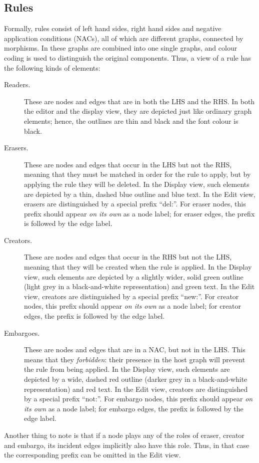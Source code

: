 \subsection{Rules}

Formally, rules consist of left hand sides, right hand sides and negative
application conditions (NACs), all of which are different graphs, connected by
morphisms. In \Groove{} these graphs are combined into one single graphs, and
colour coding is used to distinguish the original components. Thus, a \Groove{}
view of a rule has the following kinds of elements:

\begin{description}
\item[Readers.] These are nodes and edges that are in both the LHS and the RHS.
  In both the editor and the display view, they are depicted just like ordinary
  graph elements; hence, the outlines are thin and black and the font colour is
  black.

\item[Erasers.] These are nodes and edges that occur in the LHS but not the
  RHS, meaning that they must be matched in order for the rule to apply, but by
  applying the rule they will be deleted. In the Display view, such elements
  are depicted by a thin, dashed blue outline and blue text. In the Edit view,
  erasers are distinguished by a special prefix ``\textsf{del:}''. For eraser
  nodes, this prefix should appear \emph{on its own} as a node label; for
  eraser edges, the prefix is followed by the edge label.

\item[Creators.] These are nodes and edges that occur in the RHS but not the
  LHS, meaning that they will be created when the rule is applied. In the
  Display view, such elements are depicted by a slightly wider, solid green
  outline (light grey in a black-and-white representation) and green text. In
  the Edit view, creators are distinguished by a special prefix
  ``\textsf{new:}''. For creator nodes, this prefix should appear \emph{on its
  own} as a node label; for creator edges, the prefix is followed by the edge
  label.

\item[Embargoes.] These are nodes and edges that are in a NAC, but not in the
  LHS. This means that they \emph{forbidden}: their presence in the host graph
  will prevent the rule from being applied. In the Display view, such elements
  are depicted by a wide, dashed red outline (darker grey in a black-and-white
  representation) and red text. In the Edit view, creators are distinguished by
  a special prefix ``\textsf{not:}''. For embargo nodes, this prefix should
  appear \emph{on its own} as a node label; for embargo edges, the prefix is
  followed by the edge label.
\end{description}
%
Another thing to note is that if a node plays any of the roles of eraser,
creator and embargo, its incident edges implicitly also have this role. Thus,
in that case the corresponding prefix can be omitted in the Edit view.

